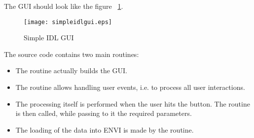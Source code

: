 The GUI should look like the figure ~\ref{simpleidlgui}.

\begin{figure}
\label{simpleidlgui}
\begin{center}
\texttt{[image: simpleidlgui.eps]}
\caption{Simple IDL GUI}
\end{center}
\end{figure}

The source code contains two main routines:
\begin{itemize}
    \item The  routine actually builds the GUI.
    \item The   routine allows handling user events, i.e. to process all user interactions.
    \item The processing itself is performed when the user hits the  button. The   routine is then called, while passing to it the required parameters.
    \item The loading of the data into ENVI is made by the  routine.
\end{itemize}

